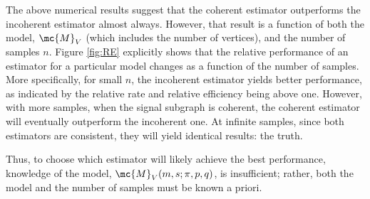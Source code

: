 \documentclass[10pt,journal,cspaper,compsoc]{IEEEtran}
\begin{document}
The above numerical results suggest that the coherent estimator outperforms the incoherent estimator almost always.  However, that result is a function of both the model, $\mc{M}_V$ (which includes the number of vertices), and the number of samples $n$.  %
Figure \ref{fig:RE} explicitly shows that the relative performance of an estimator for a particular model changes as a function of the number of samples.  More specifically, for small $n$, the incoherent estimator yields better performance, as indicated by the relative rate and relative efficiency being above one.  However, with more samples, when the signal subgraph is coherent, the coherent estimator will eventually outperform the incoherent one.  At infinite samples, since both estimators are consistent, they will yield identical results: the truth.  

Thus, to choose which estimator will likely achieve the best performance, knowledge of the model, $\mc{M}_V(m,s;\pi,p,q)$, is insufficient; rather, both the model and the number of samples must be known a priori.  
\end{document}
